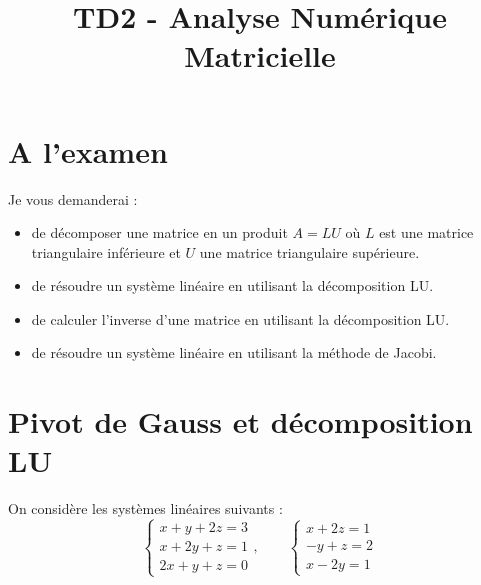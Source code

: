 \documentclass[10pt]{article}
\title{TD2 - Analyse Numérique Matricielle}
\author{}
\date{}
\begin{document}
\sffamily
\maketitle

\section*{A l'examen}
Je vous demanderai :
\begin{itemize}
    \item de décomposer une matrice en un produit $A = LU$ où $L$ est une matrice triangulaire inférieure et $U$ une matrice triangulaire supérieure.
    \item de résoudre un système linéaire en utilisant la décomposition LU.
    \item de calculer l'inverse d'une matrice en utilisant la décomposition LU.
    \item de résoudre un système linéaire en utilisant la méthode de Jacobi.
\end{itemize}

\vspace{1cm}
\section*{Pivot de Gauss et décomposition LU}
On considère les systèmes linéaires suivants :
$$
\left\{\begin{array}{l}
x+y+2 z=3 \\
x+2 y+z=1 \\
2 x+y+z=0
\end{array}\right., \qquad 
\left\{\begin{array}{l}
x+2 z=1 \\
-y+z=2 \\
x-2 y=1
\end{array}\right.
$$
\end{document}
